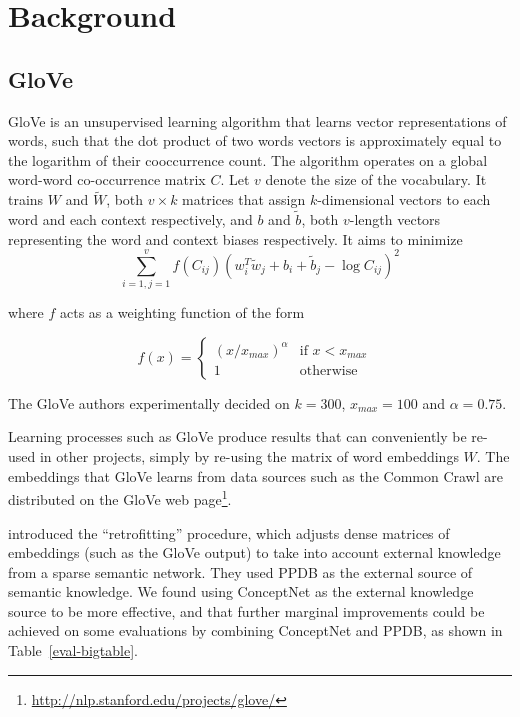 \documentclass[letterpaper]{article}
\begin{document}
\section{Background}

\subsection{GloVe}

 GloVe \cite{pennington2014glove} is an unsupervised learning algorithm that
 learns vector representations of words, such that the dot product of two words
 vectors is approximately equal to the logarithm of their cooccurrence count.
 The algorithm operates on a global word-word co-occurrence matrix $C$. Let $v$
 denote the size of the vocabulary. It trains $W$ and $\tilde{W}$, both $v
 \times k$ matrices that assign $k$-dimensional vectors to each word and each
 context respectively, and $b$ and $\tilde{b}$, both $v$-length vectors
 representing the word and context biases respectively. It aims to minimize
$$
\sum_{i=1,j=1}^v
  f \left( C_{ij} \right)
  \left( w_i^T \tilde{w}_j + b_i + \tilde{b}_j - \log{C_{ij}} \right)^2
$$

where $f$ acts as a weighting function of the form

$$
f \left( x \right) =
  \begin{cases}
    \left( x / x_{max} \right)^\alpha & \text{if $x < x_{max}$ } \\
    1 & \text{otherwise}
  \end{cases}
$$

The GloVe authors experimentally decided on $k=300$, $x_{max}=100$ and
$\alpha=0.75$.

Learning processes such as GloVe produce results that can conveniently be
re-used in other projects, simply by re-using the matrix of word embeddings $W$.
The embeddings that GloVe learns from data sources such as the Common Crawl are
distributed on the GloVe web
page\footnote{\url{http://nlp.stanford.edu/projects/glove/}}.

 introduced the ``retrofitting'' procedure,
which adjusts dense matrices of embeddings (such as the GloVe output) to take
into account external knowledge from a sparse semantic network. They used PPDB
\cite{ganitkevitch2013ppdb} as the external source of semantic knowledge. We
found using ConceptNet as the external knowledge source to be more effective,
and that further marginal improvements could be achieved on some evaluations by
combining ConceptNet and PPDB, as shown in Table~\ref{eval-bigtable}.
\end{document}
